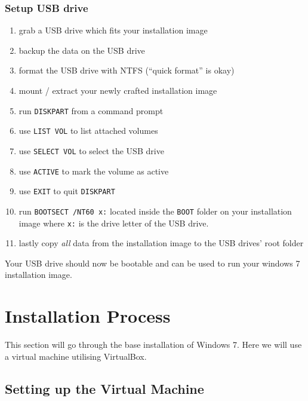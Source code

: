 \documentclass{itsarticle}
\begin{document}
\subsubsection{Setup USB drive}

\begin{enumerate}
    \item grab a USB drive which fits your installation image
    \item backup the data on the USB drive
    \item format the USB drive with NTFS (``quick format'' is okay)
    \item mount / extract your newly crafted installation image
    \item run \texttt{DISKPART} from a command prompt
    \item use \texttt{LIST VOL} to list attached volumes
    \item use \texttt{SELECT VOL} to select the USB drive
    \item use \texttt{ACTIVE} to mark the volume as active
    \item use \texttt{EXIT} to quit \texttt{DISKPART}
    \item run \texttt{BOOTSECT /NT60 x:} located inside the \texttt{BOOT}
        folder on your installation image where \texttt{x:} is the drive letter
        of the USB drive.
    \item lastly copy \emph{all} data from the installation image to the USB
        drives' root folder
\end{enumerate}

Your USB drive should now be bootable and can be used to run your windows 7
installation image.

\section{Installation Process}
\label{sec:installation}

This section will go through the base installation of Windows 7. Here we will
use a virtual machine utilising VirtualBox\footnotemark.


\subsection{Setting up the Virtual Machine}
\label{ssec:virtual_box}

\end{document}
